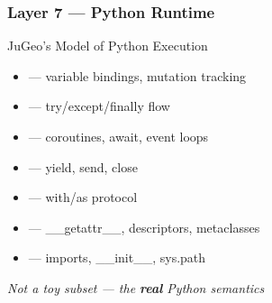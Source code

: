 \begin{frame}
\frametitle{Layer 7 --- Python Runtime}
\begin{block}{JuGeo's Model of Python Execution}
  \begin{itemize}
    \item {} --- variable bindings, mutation tracking
    \item {} --- try/except/finally flow
    \item {} --- coroutines, await, event loops
    \item {} --- yield, send, close
    \item {} --- with/as protocol
    \item {} --- \_\_getattr\_\_, descriptors, metaclasses
    \item {} --- imports, \_\_init\_\_, sys.path
  \end{itemize}
\end{block}
\vfill
\begin{center}
  {\small\color{gray}\itshape Not a toy subset --- the \textbf{real} Python semantics}
\end{center}
\end{frame}


